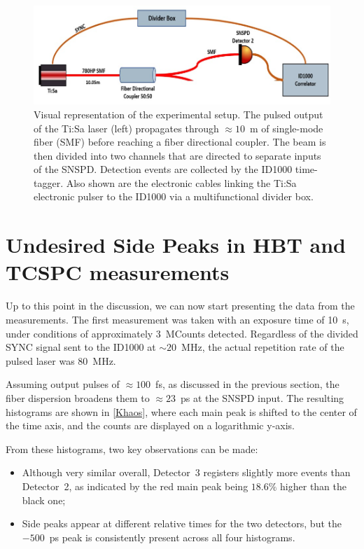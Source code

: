 \begin{figure}[hbtp]
\centering
\includegraphics[width=1\textwidth]{TiSa_Setup.jpg}
\caption{Visual representation of the experimental setup. The pulsed output of the Ti:Sa laser (left) propagates through $\approx 10$~m of single-mode fiber (SMF) before reaching a fiber directional coupler. The beam is then divided into two channels that are directed to separate inputs of the SNSPD. Detection events are collected by the ID1000 time-tagger. Also shown are the electronic cables linking the Ti:Sa electronic pulser to the ID1000 via a multifunctional divider box.}
\label{TisaSetup}
\end{figure}




\section{Undesired Side Peaks in HBT and TCSPC measurements}
\label{cpp:Initial-khaos}
Up to this point in the discussion, we can now start presenting the data from the measurements.  
The first measurement was taken with an exposure time of 10~s, under conditions of approximately 3~MCounts detected. Regardless of the divided SYNC signal sent to the ID1000 at $\sim 20$~MHz, the actual repetition rate of the pulsed laser was 80~MHz.  

Assuming output pulses of $\approx 100$~fs, as discussed in the previous section, the fiber dispersion broadens them to $\approx 23$~ps at the SNSPD input. The resulting histograms are shown in \autoref{Khaos}, where each main peak is shifted to the center of the time axis, and the counts are displayed on a logarithmic y-axis.  

From these histograms, two key observations can be made:  
\begin{itemize}
	\item Although very similar overall, Detector~3 registers slightly more events than Detector~2, as indicated by the red main peak being $18.6\%$ higher than the black one;
	\item Side peaks appear at different relative times for the two detectors, but the $-500$~ps peak is consistently present across all four histograms.
\end{itemize}

